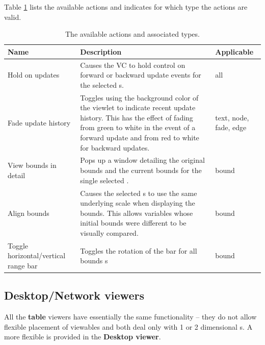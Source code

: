 Table \ref{tab:viewletactions} lists the available \viewlet{} actions
and indicates for which type the actions are valid.

\begin{table}[htp]
\centering
\begin{tabular}{|l|p{7cm}|l|}
\hline
Name & Description & Applicable \\
\hline
\hline
Hold on updates & Causes the VC to hold control on forward or backward
update events for the selected \viewlet{}s. & all \\


\hline
Fade update history & Toggles using the background color of the
viewlet to indicate recent update history.  This has the effect of
fading from green to white in the event of a forward update and from
red to white for backward updates. & text, node, fade, edge \\

\hline
View bounds in detail & Pops up a window detailing the original bounds and the current bounds for the single selected \viewlet{}. & bound \\

\hline
Align bounds & Causes the selected \viewlet{}s to use the same underlying scale when displaying the bounds.  This allows variables whose initial bounds were different to be visually compared. & bound \\

\hline
Toggle horizontal/vertical range bar & Toggles the rotation of the bar for all bounds \viewlet{}s & bound \\
\hline
\end{tabular}
\caption{The available \viewlet{} actions and associated types.}
\label{tab:viewletactions}
\end{table}

\subsection{Desktop/Network viewers}

All the \textbf{table} viewers have essentially the same functionality
-- they do not allow flexible placement of viewables and both deal
only with 1 or 2 dimensional \viewable{}s.  A more flexible \viewer{}
is provided in the \textbf{Desktop viewer}.

